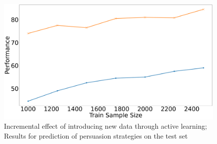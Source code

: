 \documentclass[hidelinks,11pt,a4paper]{report}
\begin{document}
\begin{table}[!t]
        \small
        \centering

        \caption{\small Comparison of caption and object detection models. We noticed that BLIP while being more recent and trained on a larger dataset, generates more informatory captions for background objects which DenseCap successfully ignores.}
        \label{tab:varying_cap_obj}
    \end{table}
        \begin{figure}[h]
        \centering
        \includegraphics[scale=0.12]{images/active_learning.pdf}
        \caption{\small Incremental effect of introducing new data through active learning; Results for prediction of persuasion strategies on the test set}
        \label{fig:AL_batch_test}
    \end{figure}
\end{document}
